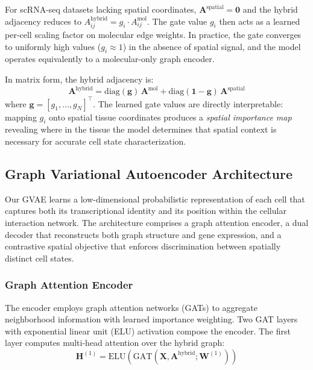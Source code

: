 \documentclass{article}
\begin{document}
For scRNA-seq datasets lacking spatial coordinates, $\mathbf{A}^{\text{spatial}} = \mathbf{0}$ and the hybrid adjacency reduces to $A^{\text{hybrid}}_{ij} = g_i \cdot A^{\text{mol}}_{ij}$. The gate value $g_i$ then acts as a learned per-cell scaling factor on molecular edge weights. In practice, the gate converges to uniformly high values ($g_i \approx 1$) in the absence of spatial signal, and the model operates equivalently to a molecular-only graph encoder.

In matrix form, the hybrid adjacency is:
\begin{equation}
    \mathbf{A}^{\text{hybrid}} = \text{diag}(\mathbf{g}) \, \mathbf{A}^{\text{mol}} + \text{diag}(\mathbf{1} - \mathbf{g}) \, \mathbf{A}^{\text{spatial}}
    \label{eq:hybrid_matrix}
\end{equation}
where $\mathbf{g} = [g_1, \ldots, g_N]^\top$. The learned gate values are directly interpretable: mapping $g_i$ onto spatial tissue coordinates produces a \textit{spatial importance map} revealing where in the tissue the model determines that spatial context is necessary for accurate cell state characterization.


\subsection{Graph Variational Autoencoder Architecture}

Our GVAE learns a low-dimensional probabilistic representation of each cell that captures both its transcriptional identity and its position within the cellular interaction network. The architecture comprises a graph attention encoder, a dual decoder that reconstructs both graph structure and gene expression, and a contrastive spatial objective that enforces discrimination between spatially distinct cell states.

\subsubsection{Graph Attention Encoder}

The encoder employs graph attention networks (GATs) \cite{velickovic2017graph} to aggregate neighborhood information with learned importance weighting. Two GAT layers with exponential linear unit (ELU) activation compose the encoder. The first layer computes multi-head attention over the hybrid graph:
\begin{equation}
    \mathbf{H}^{(1)} = \text{ELU}\!\left(\text{GAT}(\mathbf{X}, \mathbf{A}^{\text{hybrid}}; \mathbf{W}^{(1)})\right)
    \label{eq:gat_layer1}
\end{equation}
\end{document}

